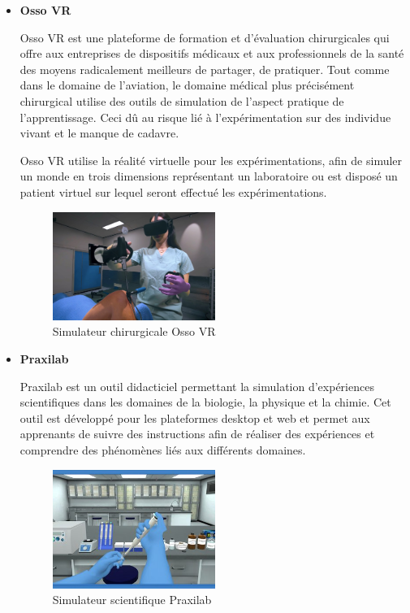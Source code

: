 \begin{itemize}
	\item \textbf{Osso VR}

	      Osso VR est une plateforme de formation et d'évaluation chirurgicales qui offre aux entreprises de dispositifs médicaux et aux professionnels de la santé des moyens radicalement meilleurs de partager, de pratiquer. Tout comme dans le domaine de l’aviation, le domaine médical plus précisément chirurgical utilise des outils de simulation de l’aspect pratique de l’apprentissage. Ceci dû au risque lié à l’expérimentation sur des individue vivant et le manque de cadavre.

	      Osso VR utilise la réalité virtuelle pour les expérimentations, afin de simuler un monde en trois dimensions représentant un laboratoire ou est disposé un patient virtuel sur lequel seront effectué les expérimentations.

	      \begin{figure}[H]
		      \centering
		      \includegraphics[width=0.5\textwidth]{img/vsurgery}
		      \caption{Simulateur chirurgicale Osso VR}
		      \label{fig:mesh1}
	      \end{figure}

	\item \textbf{Praxilab}

	Praxilab est un outil didacticiel permettant la simulation d'expériences scientifiques dans les domaines de la biologie, la physique et la chimie. Cet outil est développé pour les plateformes desktop et web et permet aux apprenants de suivre des instructions afin de réaliser des expériences et comprendre des phénomènes liés aux différents domaines.

	      \begin{figure}[H]
		      \centering
		      \includegraphics[width=0.5\textwidth]{img/vlab1}
		      \caption{Simulateur scientifique Praxilab}
		      \label{fig:mesh1}
	      \end{figure}


\end{itemize}
